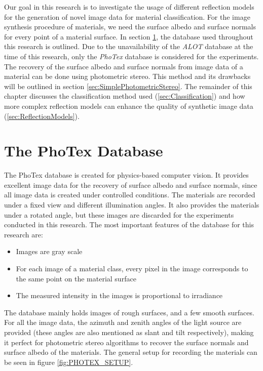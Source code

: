 \hypertarget{Approach}{
}

Our goal in this research is to investigate the usage of different reflection models for the generation of novel image data for material classification. For the image synthesis procedure of materials, we need the surface albedo and surface normals for every point of a material surface. In section \ref{sec:PhoTex}, the database used throughout this research is outlined. Due to the unavailability of the {\it ALOT} database at the time of this research, only the {\it PhoTex} database is considered for the experiments. The recovery of the surface albedo and surface normals from image data of a material can be done using photometric stereo. This method and its drawbacks will be outlined in section \ref{sec:SimplePhotometricStereo}. The remainder of this chapter discusses the classification method used (\ref{sec:Classification}) and how more complex reflection models can enhance the quality of synthetic image data (\ref{sec:ReflectionModels}).

\section{The PhoTex Database}\label{sec:PhoTex}
The PhoTex database is created for physics-based computer vision. It provides excellent image data for the recovery of surface albedo and surface normals, since all image data is created under controlled conditions. The materials are recorded under a fixed view and different illumination angles. It also provides the materials under a rotated angle, but these images are discarded for the experiments conducted in this research. The most important features of the database for this research are:

\begin{itemize}
	\item Images are gray scale
	\item For each image of a material class, every pixel in the image corresponds to the same point on the material surface
	\item The measured intensity in the images is proportional to irradiance
\end{itemize}

\noindent The database mainly holds images of rough surfaces, and a few smooth surfaces. For all the image data, the azimuth and zenith angles of the light source are provided (these angles are also mentioned as slant and tilt respectively), making it perfect for photometric stereo algorithms to recover the surface normals and surface albedo of the materials. The general setup for recording the materials can be seen in figure \ref{fig:PHOTEX_SETUP}. 

